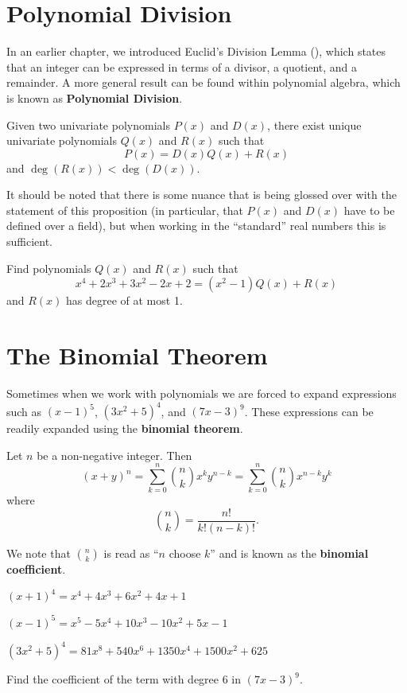 \section{Polynomial Division}
In an earlier chapter, we introduced Euclid's Division Lemma (), which states that an integer can be expressed in terms of a divisor, a quotient, and a remainder. A more general result can be found within polynomial algebra, which is known as \textbf{Polynomial Division}.
\begin{proposition}\label{prop-polynomial-division}
    Given two univariate polynomials $P(x)$ and $D(x)$, there exist unique univariate polynomials $Q(x)$ and $R(x)$ such that
    \[
        P(x) = D(x)Q(x) + R(x)
    \]
    and $\deg(R(x)) < \deg(D(x))$.
\end{proposition}
It should be noted that there is some nuance that is being glossed over with the statement of this proposition (in particular, that $P(x)$ and $D(x)$ have to be defined over a field), but when working in the ``standard'' real numbers this is sufficient.

\begin{exercise}
    Find polynomials $Q(x)$ and $R(x)$ such that
    \[
        x^4 + 2x^3 + 3x^2 - 2x + 2 = (x^2-1)Q(x) + R(x)
    \]
    and $R(x)$ has degree of at most 1.
\end{exercise}

\section{The Binomial Theorem}
Sometimes when we work with polynomials we are forced to expand expressions such as $(x-1)^5$, $(3x^2 + 5)^4$, and $(7x - 3)^9$. These expressions can be readily expanded using the \textbf{binomial theorem}.
\begin{theorem}\label{thrm-binomial}
    Let $n$ be a non-negative integer. Then
    \[
        (x+y)^n = \sum_{k=0}^n {n \choose k}x^ky^{n-k} = \sum_{k=0}^n {n \choose k}x^{n-k}y^k
    \]
    where
    \[
        {n \choose k} = \frac{n!}{k!(n-k)!}.
    \]
\end{theorem}
We note that ${n \choose k}$ is read as ``$n$ choose $k$'' and is known as the \textbf{binomial coefficient}.

\begin{example}
    $(x+1)^4 = x^4 + 4x^3 + 6x^2 + 4x + 1$
\end{example}
\begin{example}
    $(x-1)^5 = x^5-5x^4+10x^3-10x^2+5x-1$
\end{example}
\begin{example}
    $(3x^2 + 5)^4 = 81x^8+540x^6+1350x^4+1500x^2+625$
\end{example}
\begin{exercise}
    Find the coefficient of the term with degree 6 in $(7x-3)^9$.
\end{exercise}

